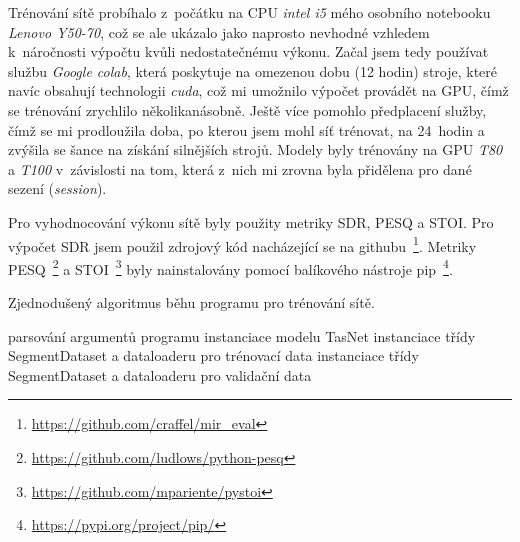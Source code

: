 Trénování sítě probíhalo z~počátku na CPU \textit{intel i5} mého osobního notebooku \textit{Lenovo Y50-70}, což se ale ukázalo jako naprosto nevhodné vzhledem k~náročnosti výpočtu kvůli nedostatečnému výkonu. Začal jsem tedy používat službu \textit{Google colab}, která poskytuje na omezenou dobu (12 hodin) stroje, které navíc obsahují technologii \textit{cuda}, což mi umožnilo výpočet provádět na GPU, čímž se trénování zrychlilo několikanásobně. Ještě více pomohlo předplacení služby, čímž se mi prodloužila doba, po kterou jsem mohl síť trénovat, na 24~hodin a zvýšila se šance na získání silnějších strojů. Modely byly trénovány na GPU \textit{T80} a \textit{T100} v~závislosti na tom, která z~nich mi zrovna byla přidělena pro dané sezení (\textit{session}). 

Pro vyhodnocování výkonu sítě byly použity metriky SDR, PESQ a STOI. Pro výpočet SDR jsem použil zdrojový kód nacházející se na githubu~\footnote{\url{https://github.com/craffel/mir_eval}}. Metriky PESQ~\footnote{\url{https://github.com/ludlows/python-pesq}} a STOI~\footnote{\url{https://github.com/mpariente/pystoi}} byly nainstalovány pomocí balíkového nástroje pip~\footnote{\url{https://pypi.org/project/pip/}}.

\bigskip

\begin{algorithm}[H]
\caption{\label{alg:zakladnibeh}Zjednodušený algoritmus běhu programu pro trénování sítě.}
\SetNoFillComment
 
 parsování argumentů programu\;
 instanciace modelu TasNet\;
 instanciace třídy SegmentDataset a dataloaderu pro trénovací data\;
 instanciace třídy SegmentDataset a dataloaderu pro validační data\;

\end{algorithm}


